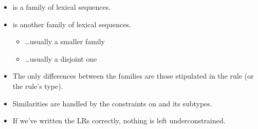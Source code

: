 \documentclass[a4paper,landscape,headrule,footrule]{foils}
\begin{document}
\begin{itemize}
\item {} is a family of lexical sequences.
\item {} is another family of lexical sequences.
  \begin{itemize}
  \item \ldots usually a smaller family
  \item \ldots usually a disjoint one
  \end{itemize}
\item The only differences between the families are those
  stipulated in the rule (or the rule's type).
\item Similarities are handled by the constraints on 
  and its subtypes.
\item If we've written the LRs correctly, nothing is left
  underconstrained.
\end{itemize}

\begin{center}
\end{center}

\begin{center}
\end{center}
\end{document}
